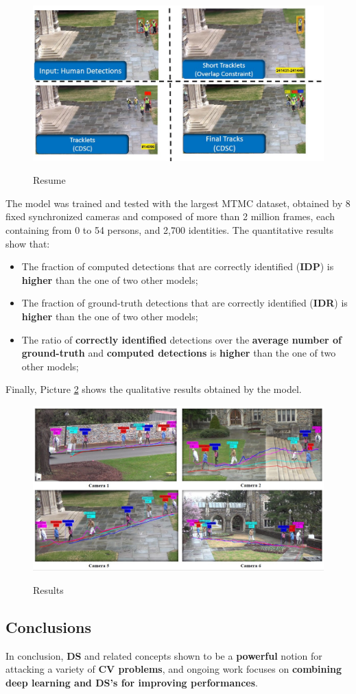 \begin{figure}[h!]
    \centering
    \includegraphics[scale = 1.4]{img/camera9.jpg}
    \label{camera9}
    \caption{Resume}
\end{figure}

The model was trained and tested with the largest MTMC dataset, obtained by 8 fixed synchronized cameras and composed of more than 2 million frames, each containing from 0 to 54 persons, and 2,700 identities. The quantitative results show that:

\begin{itemize}
    \item The fraction of computed detections that are correctly identified (\textbf{IDP}) is \textbf{higher} than the one of two other models;
    \item The fraction of ground-truth detections that are correctly identified (\textbf{IDR}) is \textbf{higher} than the one of two other models;
    \item The ratio of \textbf{correctly identified} detections over the \textbf{average number of ground-truth} and \textbf{computed detections} is \textbf{higher} than the one of two other models;
\end{itemize}

Finally, Picture \ref{camera16} shows the qualitative results obtained by the model.

\begin{figure}[h!]
    \centering
    \includegraphics[scale = 1.4]{img/camera16.jpg}
    \label{camera16}
    \caption{Results}
\end{figure}

\subsection{Conclusions}

In conclusion, \textbf{DS} and related concepts shown to be a \textbf{powerful} notion for attacking a variety of \textbf{CV problems}, and ongoing work focuses on \textbf{combining deep learning and DS's for improving performances}.

